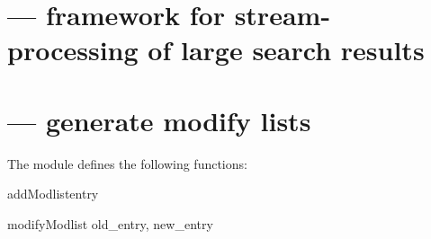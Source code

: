 \section{ ---
  framework for stream-processing of large search results }


\section{ ---
  generate modify lists }

The  module defines the following functions:

\begin{funcdesc}{addModlist}{entry } %
\end{funcdesc}

\begin{funcdesc}{modifyModlist}{ old_entry, new_entry } %
\end{funcdesc}

